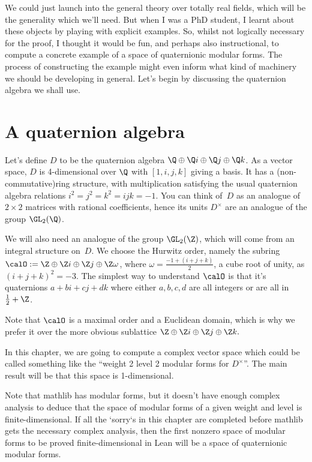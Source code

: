 We could just launch into the general theory over totally real fields, which will be the generality
which we'll need. But when I was a PhD student, I learnt about
these objects by playing with explicit examples. So, whilst not logically necessary for the proof,
I thought it would be fun, and perhaps also instructional, to compute a concrete example of a space
of quaternionic modular forms. The process of constructing the example might even inform what kind
of machinery we should be developing in general. Let's begin by discussing the quaternion algebra
we shall use.

\section{A quaternion algebra}

Let's define $D$ to be the quaternion algebra $\Q\oplus\Q i\oplus\Q j\oplus\Q k$. As a vector
space, $D$ is 4-dimensional over $\Q$ with $[1,i,j,k]$ giving a basis. It has a (non-commutative)ring structure,
with multiplication satisfying the usual quaternion algebra relations $i^2=j^2=k^2=ijk=-1$.
You can think of~$D$ as an analogue of $2\times 2$
matrices with rational coefficients, hence its units $D^\times$ are an analogue of the
group $\GL_2(\Q)$.

We will also need an analogue of the group $\GL_2(\Z)$, which will come from an integral structure
on~$D$. We choose the Hurwitz order, namely the subring $\calO:=\Z\oplus\Z i\oplus\Z j\oplus\Z \omega$,
where $\omega=\frac{-1+(i+j+k)}{2}$, a cube root of unity, as $(i+j+k)^2=-3$. The simplest way
to understand $\calO$ is that it's quaternions $a+bi+cj+dk$ where either $a,b,c,d$ are all integers
or are all in $\frac{1}{2}+\Z$.

Note that $\calO$ is a maximal order and a Euclidean domain, which is why we prefer it over the
more obvious sublattice $\Z\oplus\Z i\oplus\Z j\oplus\Z k.$

In this chapter, we are going to compute a complex vector space which could be called something
like the ``weight 2 level 2 modular forms for $D^\times$''. The main result will be that this
space is 1-dimensional.

Note that mathlib has modular forms, but it doesn't have enough complex analysis to deduce
that the space of modular forms of a given weight and level is finite-dimensional. If all
the `sorry`s in this chapter are completed
before mathlib gets the necessary complex analysis, then the first nonzero space of modular forms
to be proved finite-dimensional in Lean will be a space of quaternionic modular forms.

